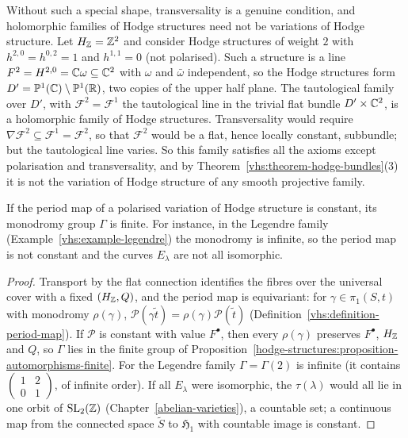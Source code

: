 \begin{counterexample}\label{vhs:counterexample-not-horizontal}
Without such a special shape, transversality is a genuine condition, and holomorphic families of Hodge structures need not be variations of Hodge structure. Let $H_{\mathbb{Z}} = \mathbb{Z}^2$ and consider
Hodge structures of weight $2$ with $h^{2,0} = h^{0,2} = 1$ and $h^{1,1} = 0$ (not polarised). Such a structure is a line $F^2 = H^{2,0} = \mathbb{C}\omega \subseteq \mathbb{C}^2$ with $\omega$ and $\bar\omega$
independent, so the Hodge structures form $D' = \mathbb{P}^1(\mathbb{C}) \setminus \mathbb{P}^1(\mathbb{R})$, two copies of the upper half plane. The tautological family over $D'$, with $\mathcal{F}^2 = \mathcal{F}^1$ the tautological
line in the trivial flat bundle $D' \times \mathbb{C}^2$, is a holomorphic family of Hodge structures. Transversality would require $\nabla\mathcal{F}^2 \subseteq \mathcal{F}^1 = \mathcal{F}^2$, so that $\mathcal{F}^2$
would be a flat, hence locally constant, subbundle; but the tautological line varies. So this family satisfies all the axioms except polarisation and transversality, and by
Theorem~\ref{vhs:theorem-hodge-bundles}(3) it is not the variation of Hodge structure of any smooth projective family.
\end{counterexample}

\begin{corollary}\label{vhs:corollary-constant-period-map}
If the period map of a polarised variation of Hodge structure is constant, its monodromy group $\Gamma$ is finite. For instance, in the Legendre family (Example~\ref{vhs:example-legendre}) the monodromy is infinite,
so the period map is not constant and the curves $E_\lambda$ are not all isomorphic.
\end{corollary}

\begin{proof}
Transport by the flat connection identifies the fibres over the universal cover with a fixed $(H_{\mathbb{Z}}, Q)$, and the period map is equivariant: for $\gamma \in \pi_1(S, t)$ with monodromy $\rho(\gamma)$,
$\mathcal{P}(\gamma\tilde t) = \rho(\gamma)\mathcal{P}(\tilde t)$ (Definition~\ref{vhs:definition-period-map}). If $\mathcal{P}$ is constant with value $F^\bullet$, then every $\rho(\gamma)$ preserves $F^\bullet$, $H_{\mathbb{Z}}$
and $Q$, so $\Gamma$ lies in the finite group of Proposition~\ref{hodge-structures:proposition-automorphisms-finite}. For the Legendre family $\Gamma = \Gamma(2)$ is infinite (it contains
$\begin{pmatrix}1 & 2\\ 0 & 1\end{pmatrix}$, of infinite order). If all $E_\lambda$ were isomorphic, the $\tau(\lambda)$ would all lie in one orbit of $\mathrm{SL}_2(\mathbb{Z})$ (Chapter~\ref{abelian-varieties}),
a countable set; a continuous map from the connected space $\tilde S$ to $\mathfrak{H}_1$ with countable image is constant.
\end{proof}

